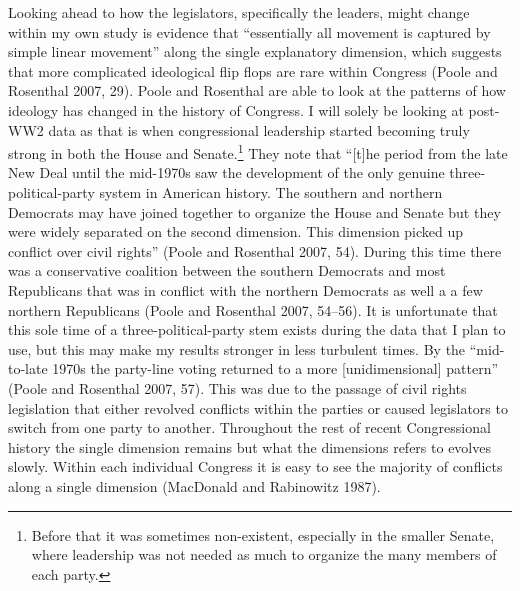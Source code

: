 \documentclass[12pt,twoside]{reedthesis}
\begin{document}
  Looking ahead to how the legislators, specifically the leaders, might
  change within my own study is evidence that ``essentially all movement
  is captured by simple linear movement'' along the single explanatory
  dimension, which suggests that more complicated ideological flip flops
  are rare within Congress (Poole and Rosenthal 2007, 29). Poole and
  Rosenthal are able to look at the patterns of how ideology has changed
  in the history of Congress. I will solely be looking at post-WW2 data as
  that is when congressional leadership started becoming truly strong in
  both the House and Senate.\footnote{Before that it was sometimes
    non-existent, especially in the smaller Senate, where leadership was
    not needed as much to organize the many members of each party.} They
  note that ``{[}t{]}he period from the late New Deal until the mid-1970s
  saw the development of the only genuine three-political-party system in
  American history. The southern and northern Democrats may have joined
  together to organize the House and Senate but they were widely separated
  on the second dimension. This dimension picked up conflict over civil
  rights'' (Poole and Rosenthal 2007, 54). During this time there was a
  conservative coalition between the southern Democrats and most
  Republicans that was in conflict with the northern Democrats as well a a
  few northern Republicans (Poole and Rosenthal 2007, 54--56). It is
  unfortunate that this sole time of a three-political-party stem exists
  during the data that I plan to use, but this may make my results
  stronger in less turbulent times. By the ``mid-to-late 1970s the
  party-line voting returned to a more {[}unidimensional{]} pattern''
  (Poole and Rosenthal 2007, 57). This was due to the passage of civil
  rights legislation that either revolved conflicts within the parties or
  caused legislators to switch from one party to another. Throughout the
  rest of recent Congressional history the single dimension remains but
  what the dimensions refers to evolves slowly. Within each individual
  Congress it is easy to see the majority of conflicts along a single
  dimension (MacDonald and Rabinowitz 1987).
  
\end{document}
